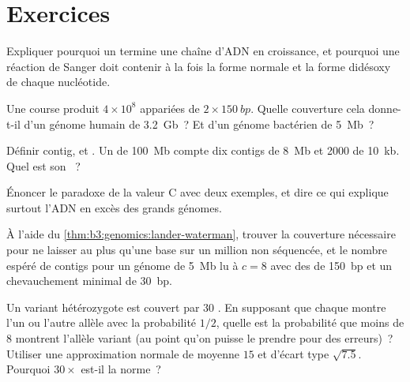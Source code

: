 \section{Exercices}

\begin{exercise}[$\star$]\label{exo:b3:genomics:1}
Expliquer pourquoi un  termine une chaîne d'ADN en
croissance, et pourquoi une réaction de Sanger doit contenir à la fois
la forme normale et la forme didésoxy de chaque nucléotide.
\end{exercise}

\begin{exercise}[$\star$]\label{exo:b3:genomics:2}
Une course produit $4\times 10^{8}$  appariées de
$2\times \qty{150}{bp}$. Quelle couverture cela donne-t-il d'un génome
humain de \qty{3.2}{Gb}~? Et d'un génome bactérien de \qty{5}{Mb}~?
\end{exercise}

\begin{exercise}[$\star$]\label{exo:b3:genomics:3}
Définir contig,  et . Un  de \qty{100}{Mb}
compte dix contigs de \qty{8}{Mb} et \num{2000} de \qty{10}{kb}. Quel
est son ~?
\end{exercise}

\begin{exercise}[$\star$]\label{exo:b3:genomics:4}
Énoncer le paradoxe de la valeur C avec deux exemples, et dire ce qui
explique surtout l'ADN en excès des grands génomes.
\end{exercise}

\begin{exercise}[$\star\star$]\label{exo:b3:genomics:5}
À l'aide du \cref{thm:b3:genomics:lander-waterman}, trouver la
couverture nécessaire pour ne laisser au plus qu'une base sur un million
non séquencée, et le nombre espéré de contigs pour un génome de
\qty{5}{Mb} lu à $c = 8$ avec des  de \qty{150}{bp} et un
chevauchement minimal de \qty{30}{bp}.
\end{exercise}

\begin{exercise}[$\star\star$]\label{exo:b3:genomics:6}
Un variant hétérozygote est couvert par $30$ . En supposant que
chaque  montre l'un ou l'autre allèle avec la probabilité $1/2$,
quelle est la probabilité que moins de $8$  montrent l'allèle
variant (au point qu'on puisse le prendre pour des erreurs)~? Utiliser
une approximation normale de moyenne $15$ et d'écart type $\sqrt{7.5}$.
Pourquoi $30\times$ est-il la norme~?
\end{exercise}

